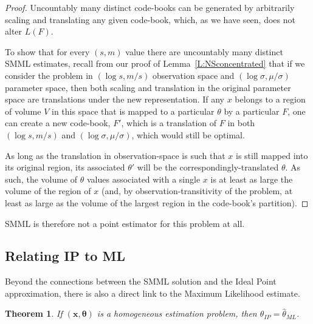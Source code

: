 \documentclass{IEEEtran}
\newtheorem{thm}{Theorem}
\begin{document}
\begin{proof}
Uncountably many distinct code-books can be generated by arbitrarily scaling
and translating any given code-book, which, as we have seen, does not alter
$L(F)$.

To show that for every $(s,m)$ value there are uncountably many distinct SMML
estimates, recall from our proof of Lemma~\ref{L:NSconcentrated}
that if we consider the problem in $(\log s,m/s)$
observation space and $(\log \sigma,\mu/\sigma)$ parameter space, then both
scaling and translation in the original parameter space are translations under
the new representation. If any $x$ belongs to a region of volume $V$ in this
space that is mapped to a particular $\theta$ by a particular $F$, one can
create a new code-book, $F'$, which is a translation of $F$ in both
$(\log s,m/s)$ and $(\log \sigma,\mu/\sigma)$, which would still be optimal.

As long as the translation in observation-space is such that $x$ is still
mapped into its original region, its associated $\theta'$ will be the
correspondingly-translated $\theta$. As such, the volume of $\theta$ values
associated with a single $x$ is at least as large the volume of the region
of $x$ (and, by observation-transitivity of the problem, at least as large as the volume
of the largest region in the code-book's partition).
\end{proof}

SMML is therefore not a point estimator for this problem at all.

\subsection{Relating IP to ML}

Beyond the connections between the SMML solution and the Ideal Point
approximation, there is also a direct link to the Maximum Likelihood estimate.

\begin{thm}\label{T:IP_ML}
If $(\mathbf{x},\boldsymbol{\theta})$ is a homogeneous estimation
problem, then $\hat{\theta}_{\textit{IP}}=\hat{\theta}_{\textit{ML}}$.
\end{thm}
\end{document}
